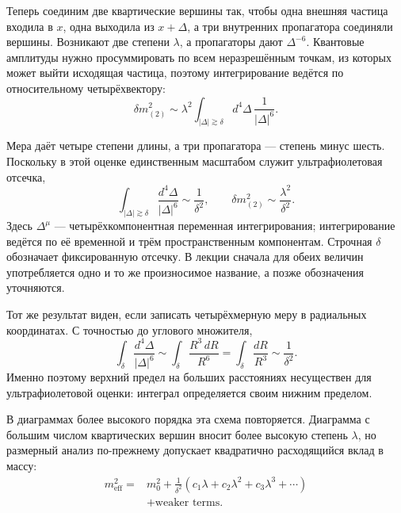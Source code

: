 Теперь соединим две квартические вершины так, чтобы одна внешняя частица входила в \(x\), одна выходила из \(x+\Delta\), а три внутренних пропагатора соединяли вершины. Возникают две степени \(\lambda\), а пропагаторы дают \(\Delta^{-6}\). Квантовые амплитуды нужно просуммировать по всем неразрешённым точкам, из которых может выйти исходящая частица, поэтому интегрирование ведётся по относительному четырёхвектору:
\begin{equation}
\delta m^2_{(2)}
\sim
\lambda^2
\int_{|\Delta|\gtrsim\delta}
d^4\Delta\,\frac{1}{|\Delta|^6}.
\label{eq:two-loop-power-count}
\end{equation}

\begin{classroomqa}
\end{classroomqa}

Мера даёт четыре степени длины, а три пропагатора — степень минус шесть. Поскольку в этой оценке единственным масштабом служит ультрафиолетовая отсечка,
\begin{equation}
\int_{|\Delta|\gtrsim\delta}
\frac{d^4\Delta}{|\Delta|^6}
\sim\frac{1}{\delta^2},
\qquad
\delta m^2_{(2)}
\sim\frac{\lambda^2}{\delta^2}.
\label{eq:two-loop-scalar-mass}
\end{equation}
Здесь \(\Delta^\mu\) — четырёхкомпонентная переменная интегрирования; интегрирование ведётся по её временной и трём пространственным компонентам. Строчная \(\delta\) обозначает фиксированную отсечку. В лекции сначала для обеих величин употребляется одно и то же произносимое название, а позже обозначения уточняются.

Тот же результат виден, если записать четырёхмерную меру в радиальных координатах. С точностью до углового множителя,
\begin{equation}
\int_{\delta}\frac{d^4\Delta}{|\Delta|^6}
\sim
\int_{\delta}\frac{R^3\,dR}{R^6}
=\int_{\delta}\frac{dR}{R^3}
\sim\frac{1}{\delta^2}.
\end{equation}
Именно поэтому верхний предел на больших расстояниях несуществен для ультрафиолетовой оценки: интеграл определяется своим нижним пределом.

В диаграммах более высокого порядка эта схема повторяется. Диаграмма с большим числом квартических вершин вносит более высокую степень \(\lambda\), но размерный анализ по-прежнему допускает квадратично расходящийся вклад в массу:
\begin{equation}
\begin{aligned}
m_{\mathrm{eff}}^2
={}&m_0^2
+\frac{1}{\delta^2}
\left(c_1\lambda+c_2\lambda^2+c_3\lambda^3+\cdots\right)\\
&+\text{weaker terms}.
\end{aligned}
\label{eq:scalar-mass-series}
\end{equation}

